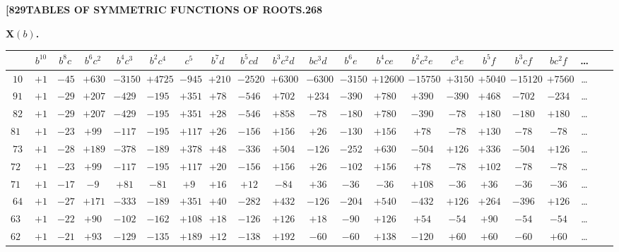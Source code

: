 \documentclass[11pt,a4paper]{book}
\begin{document}
\newpage
\setcounter{page}{268}

\noindent\textbf{[829}\hfill\textbf{TABLES OF SYMMETRIC FUNCTIONS OF ROOTS.}\hfill\textbf{268}

\bigskip

\noindent\textbf{X$(b)$.}
\begin{center}
\tiny
\begin{tabular}{c|c|c|c|c|c|c|c|c|c|c|c|c|c|c|c|c|c|c|c|c}
& $b^{10}$ & $b^8c$ & $b^6c^2$ & $b^4c^3$ & $b^2c^4$ & $c^5$ & $b^7d$ & $b^5cd$ & $b^3c^2d$ & $bc^3d$ & $b^6e$ & $b^4ce$ & $b^2c^2e$ & $c^3e$ & $b^5f$ & $b^3cf$ & $bc^2f$ & \dots \\
\hline
$10$ & $+1$ & $-45$ & $+630$ & $-3150$ & $+4725$ & $-945$ & $+210$ & $-2520$ & $+6300$ & $-6300$ & $-3150$ & $+12600$ & $-15750$ & $+3150$ & $+5040$ & $-15120$ & $+7560$ & \dots \\
$91$ & $+1$ & $-29$ & $+207$ & $-429$ & $-195$ & $+351$ & $+78$ & $-546$ & $+702$ & $+234$ & $-390$ & $+780$ & $+390$ & $-390$ & $+468$ & $-702$ & $-234$ & \dots \\
$82$ & $+1$ & $-29$ & $+207$ & $-429$ & $-195$ & $+351$ & $+28$ & $-546$ & $+858$ & $-78$ & $-180$ & $+780$ & $-390$ & $-78$ & $+180$ & $-180$ & $+180$ & \dots \\
$811$ & $+1$ & $-23$ & $+99$ & $-117$ & $-195$ & $+117$ & $+26$ & $-156$ & $+156$ & $+26$ & $-130$ & $+156$ & $+78$ & $-78$ & $+130$ & $-78$ & $-78$ & \dots \\
$73$ & $+1$ & $-28$ & $+189$ & $-378$ & $-189$ & $+378$ & $+48$ & $-336$ & $+504$ & $-126$ & $-252$ & $+630$ & $-504$ & $+126$ & $+336$ & $-504$ & $+126$ & \dots \\
$721$ & $+1$ & $-23$ & $+99$ & $-117$ & $-195$ & $+117$ & $+20$ & $-156$ & $+156$ & $+26$ & $-102$ & $+156$ & $+78$ & $-78$ & $+102$ & $-78$ & $-78$ & \dots \\
$7111$ & $+1$ & $-17$ & $-9$ & $+81$ & $-81$ & $+9$ & $+16$ & $+12$ & $-84$ & $+36$ & $-36$ & $-36$ & $+108$ & $-36$ & $+36$ & $-36$ & $-36$ & \dots \\
$64$ & $+1$ & $-27$ & $+171$ & $-333$ & $-189$ & $+351$ & $+40$ & $-282$ & $+432$ & $-126$ & $-204$ & $+540$ & $-432$ & $+126$ & $+264$ & $-396$ & $+126$ & \dots \\
$631$ & $+1$ & $-22$ & $+90$ & $-102$ & $-162$ & $+108$ & $+18$ & $-126$ & $+126$ & $+18$ & $-90$ & $+126$ & $+54$ & $-54$ & $+90$ & $-54$ & $-54$ & \dots \\
$622$ & $+1$ & $-21$ & $+93$ & $-129$ & $-135$ & $+189$ & $+12$ & $-138$ & $+192$ & $-60$ & $-60$ & $+138$ & $-120$ & $+60$ & $+60$ & $-60$ & $+60$ & \dots \\

\end{tabular}
\end{center}
\end{document}
